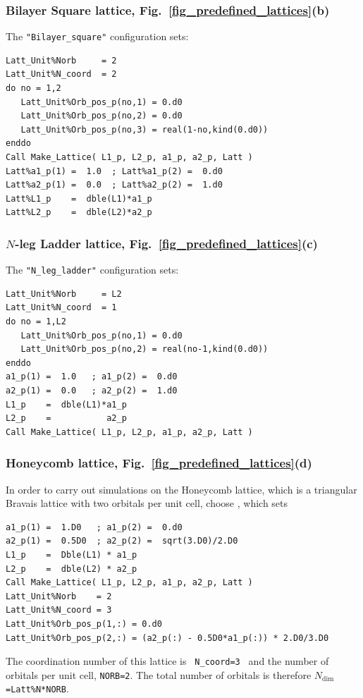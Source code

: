 \subsubsection{Bilayer Square lattice, Fig.~\ref{fig_predefined_lattices}(b)}
The \texttt{"Bilayer\_square"}   configuration sets:
\begin{lstlisting}[style=fortran]
Latt_Unit%Norb     = 2
Latt_Unit%N_coord  = 2
do no = 1,2
   Latt_Unit%Orb_pos_p(no,1) = 0.d0 
   Latt_Unit%Orb_pos_p(no,2) = 0.d0 
   Latt_Unit%Orb_pos_p(no,3) = real(1-no,kind(0.d0))
enddo
Call Make_Lattice( L1_p, L2_p, a1_p, a2_p, Latt )
Latt%a1_p(1) =  1.0  ; Latt%a1_p(2) =  0.d0
Latt%a2_p(1) =  0.0  ; Latt%a2_p(2) =  1.d0
Latt%L1_p    =  dble(L1)*a1_p
Latt%L2_p    =  dble(L2)*a2_p
\end{lstlisting}


\subsubsection{$N$-leg Ladder lattice,  Fig.~\ref{fig_predefined_lattices}(c)}
The \texttt{"N\_leg\_ladder"}   configuration sets:
\begin{lstlisting}[style=fortran]
Latt_Unit%Norb     = L2
Latt_Unit%N_coord  = 1
do no = 1,L2
   Latt_Unit%Orb_pos_p(no,1) = 0.d0 
   Latt_Unit%Orb_pos_p(no,2) = real(no-1,kind(0.d0))
enddo
a1_p(1) =  1.0   ; a1_p(2) =  0.d0
a2_p(1) =  0.0   ; a2_p(2) =  1.d0
L1_p    =  dble(L1)*a1_p
L2_p    =           a2_p
Call Make_Lattice( L1_p, L2_p, a1_p, a2_p, Latt )
\end{lstlisting}


\subsubsection{Honeycomb lattice, Fig.~\ref{fig_predefined_lattices}(d)}

In order to carry out simulations on the Honeycomb lattice, which is a triangular Bravais lattice with two orbitals per unit cell, choose , which sets
\begin{lstlisting}[style=fortran]
a1_p(1) =  1.D0   ; a1_p(2) =  0.d0
a2_p(1) =  0.5D0  ; a2_p(2) =  sqrt(3.D0)/2.D0
L1_p    =  Dble(L1) * a1_p
L2_p    =  dble(L2) * a2_p
Call Make_Lattice( L1_p, L2_p, a1_p, a2_p, Latt )
Latt_Unit%Norb    = 2
Latt_Unit%N_coord = 3
Latt_Unit%Orb_pos_p(1,:) = 0.d0 
Latt_Unit%Orb_pos_p(2,:) = (a2_p(:) - 0.5D0*a1_p(:)) * 2.D0/3.D0
\end{lstlisting}
The coordination number of this lattice is \texttt{ N\_coord=3 }  and  the number of orbitals per unit cell, \texttt{NORB=2}. The total number of orbitals is therefore \texttt{$N_{\mathrm{dim}}$=Latt\%N*NORB}.



